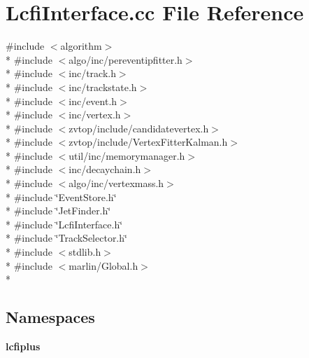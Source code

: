 \section{Lcfi\-Interface.\-cc File Reference}
\label{LcfiInterface_8cc}
{\ttfamily \#include $<$algorithm$>$}\\*
{\ttfamily \#include $<$algo/inc/pereventipfitter.\-h$>$}\\*
{\ttfamily \#include $<$inc/track.\-h$>$}\\*
{\ttfamily \#include $<$inc/trackstate.\-h$>$}\\*
{\ttfamily \#include $<$inc/event.\-h$>$}\\*
{\ttfamily \#include $<$inc/vertex.\-h$>$}\\*
{\ttfamily \#include $<$zvtop/include/candidatevertex.\-h$>$}\\*
{\ttfamily \#include $<$zvtop/include/\-Vertex\-Fitter\-Kalman.\-h$>$}\\*
{\ttfamily \#include $<$util/inc/memorymanager.\-h$>$}\\*
{\ttfamily \#include $<$inc/decaychain.\-h$>$}\\*
{\ttfamily \#include $<$algo/inc/vertexmass.\-h$>$}\\*
{\ttfamily \#include \char`\"{}Event\-Store.\-h\char`\"{}}\\*
{\ttfamily \#include \char`\"{}Jet\-Finder.\-h\char`\"{}}\\*
{\ttfamily \#include \char`\"{}Lcfi\-Interface.\-h\char`\"{}}\\*
{\ttfamily \#include \char`\"{}Track\-Selector.\-h\char`\"{}}\\*
{\ttfamily \#include $<$stdlib.\-h$>$}\\*
{\ttfamily \#include $<$marlin/\-Global.\-h$>$}\\*
\subsection*{Namespaces}
\begin{DoxyCompactItemize}
\item 
{\bf lcfiplus}
\end{DoxyCompactItemize}
